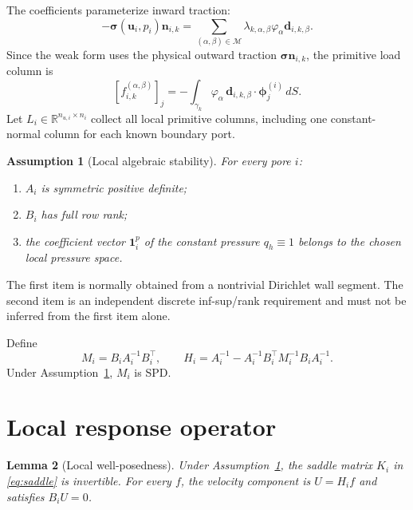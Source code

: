 \documentclass[11pt,a4paper]{article}
\newtheorem{assumption}{Assumption}[section]
\newtheorem{lemma}[assumption]{Lemma}
\newcommand{\R}{\mathbb{R}}
\newcommand{\vel}{\bm{u}}
\newcommand{\pres}{p}
\newcommand{\normal}{\bm n}
\newcommand{\stress}{\bm\sigma}
\newcommand{\modeset}{\mathcal M}
\begin{document}
The coefficients parameterize inward traction:
\begin{equation}\label{eq:inward-traction}
 -\stress(\vel_i,\pres_i)\normal_{i,k}
 =\sum_{(\alpha,\beta)\in\modeset}
 \lambda_{k,\alpha,\beta}\varphi_\alpha\bm d_{i,k,\beta}.
\end{equation}
Since the weak form uses the physical outward traction
$\stress\normal_{i,k}$, the primitive load column is
\begin{equation}\label{eq:load}
 [f_{i,k}^{(\alpha,\beta)}]_j
 =-\int_{\gamma_k}\varphi_\alpha\,
 \bm d_{i,k,\beta}\cdot\bm\phi_j^{(i)}\,dS.
\end{equation}
Let $L_i\in\R^{n_{u,i}\times n_i}$ collect all local primitive columns,
including one constant-normal column for each known boundary port.

\begin{assumption}[Local algebraic stability]\label{ass:stability}
For every pore $i$:
\begin{enumerate}[label=(\alph*),nosep,leftmargin=*]
 \item $A_i$ is symmetric positive definite;
 \item $B_i$ has full row rank;
 \item the coefficient vector $\mathbf 1_i^p$ of the constant pressure
 $q_h\equiv1$ belongs to the chosen local pressure space.
\end{enumerate}
\end{assumption}

The first item is normally obtained from a nontrivial Dirichlet wall segment.
The second item is an independent discrete inf-sup/rank requirement and must
not be inferred from the first item alone.

Define
\begin{equation}\label{eq:H}
 M_i=B_iA_i^{-1}B_i^\top,
 \qquad
 H_i=A_i^{-1}-A_i^{-1}B_i^\top M_i^{-1}B_iA_i^{-1}.
\end{equation}
Under Assumption~\ref{ass:stability}, $M_i$ is SPD.

\section{Local response operator}

\begin{lemma}[Local well-posedness]\label{lem:wellposed}
Under Assumption~\ref{ass:stability}, the saddle matrix $K_i$ in
\eqref{eq:saddle} is invertible.  For every $f$, the velocity component is
$U=H_if$ and satisfies $B_iU=0$.
\end{lemma}
\end{document}
